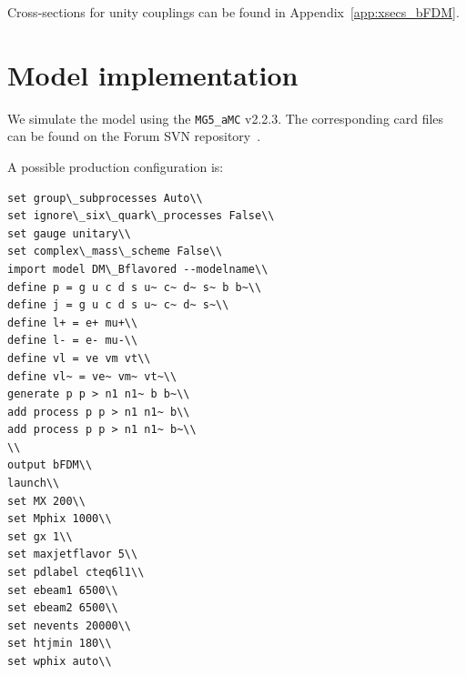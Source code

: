 Cross-sections for unity couplings can be found in Appendix~\ref{app:xsecs_bFDM}.

\section{Model implementation}


We simulate the model using the {\tt MG5\_aMC} v2.2.3. The corresponding card files can be found 
on the Forum SVN repository~\cite{ForumSVN_DMSingleB}.

A possible production configuration is:
\vspace{0.3cm}
\newline
\begin{verbatim}
set group\_subprocesses Auto\\
set ignore\_six\_quark\_processes False\\
set gauge unitary\\
set complex\_mass\_scheme False\\
import model DM\_Bflavored --modelname\\
define p = g u c d s u~ c~ d~ s~ b b~\\
define j = g u c d s u~ c~ d~ s~\\
define l+ = e+ mu+\\
define l- = e- mu-\\
define vl = ve vm vt\\
define vl~ = ve~ vm~ vt~\\
generate p p > n1 n1~ b b~\\
add process p p > n1 n1~ b\\
add process p p > n1 n1~ b~\\
\\
output bFDM\\
launch\\
set MX 200\\
set Mphix 1000\\
set gx 1\\
set maxjetflavor 5\\
set pdlabel cteq6l1\\
set ebeam1 6500\\
set ebeam2 6500\\
set nevents 20000\\
set htjmin 180\\
set wphix auto\\
\end{verbatim}

